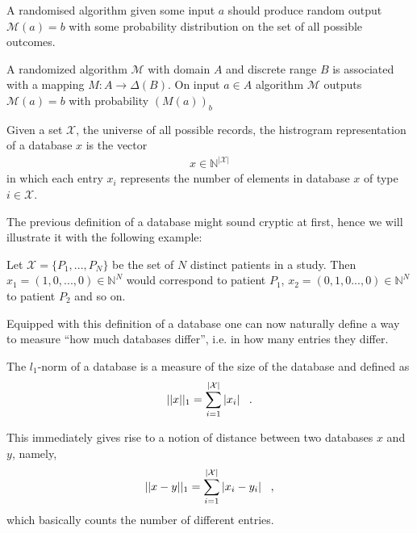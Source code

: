 A randomised algorithm given some input $a$ should produce random output $\mathcal{M}(a)=b$ with some probability distribution on the set of all possible outcomes.
\begin{definition}
    A randomized algorithm $\mathcal{M}$ with domain $A$ and discrete range $B$ is associated with a mapping $M: A \rightarrow \Delta(B)$. On input $a\in A$ algorithm $\mathcal{M}$ outputs $\mathcal{M}(a)=b$ with probability $(M(a))_b$
\end{definition}

\begin{definition}
        Given a set $\mathcal{X}$, the universe of all possible records, the histrogram representation of a database $x$ is the vector
        \begin{align}
            x \in \mathbb{N}^{|\mathcal{X}|}
        \end{align}
       in which each entry $x_i$ represents the number of elements in database $x$ of type $i\in \mathcal{X}$.
\end{definition}

The previous definition of a database might sound cryptic at first, hence we will illustrate it with the following example:
\begin{ex}
    Let $\mathcal{X}=\{P_1, ..., P_N\}$ be the set of $N$ distinct patients in a study. Then $x_1 = (1,0,...,0) \in \mathbb{N}^N$ would correspond to patient $P_1$, $x_2 = (0,1,0...,0) \in \mathbb{N}^N$ to patient $P_2$ and so on.
\end{ex}

Equipped with this definition of a database one can now naturally define a way to measure ``how much databases differ'', i.e. in how many entries they differ.

\begin{definition}
    The $l_1$-norm of a database is a measure of the size of the database and defined as
    \begin{align}
        ||x||_1 = \sum_{i=1}^{|\mathcal{X}|} |x_i| \;\;\;.
    \end{align}
\end{definition}

This immediately gives rise to a notion of distance between two databases $x$ and $y$, namely,
\begin{align}
    ||x-y||_1   = \sum_{i=1}^{|\mathcal{X}|} |x_i-y_i| \;\;\;,
\end{align}
which basically counts the number of different entries.

